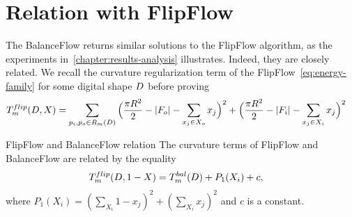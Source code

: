 \section{Relation with FlipFlow}
	The BalanceFlow returns similar solutions to the FlipFlow algorithm, as the experiments in~\cref{chapter:results-analysis} illustrates. Indeed, they are closely related. We recall the curvature regularization term of the FlipFlow~\cref{eq:energy-family} for some digital shape $D$ before proving 
\begin{align}
T_{m}^{flip}(D,X) &= \sum_{ p_i,p_o \in R_m(D)}{ \Big( \frac{\pi R^2}{2} - |F_o| - \sum_{x_j \in X_o}{x_j}\Big)^2 + \Big(\frac{\pi R^2}{2} - |F_i| - \sum_{x_j \in X_i}{x_j}\Big)^2 }
\label{eq:curvature-term}
\end{align}
%
\begin{proposition}{FlipFlow and BalanceFlow relation}
The curvature terms of FlipFlow and BalanceFlow are related by the equality
\begin{align*}
T_{m}^{flip}(D,1-X) &= T_{m}^{bal}(D) + P_1(X_i) + c,
\end{align*}
where $P_1(X_i) = (\sum_{X_i}{ 1-x_j})^2 + (\sum_{X_i}{x_j})^2$ and $c$ is a constant.
\label{prop:flipflow-balanceflow-relation}
\end{proposition}

